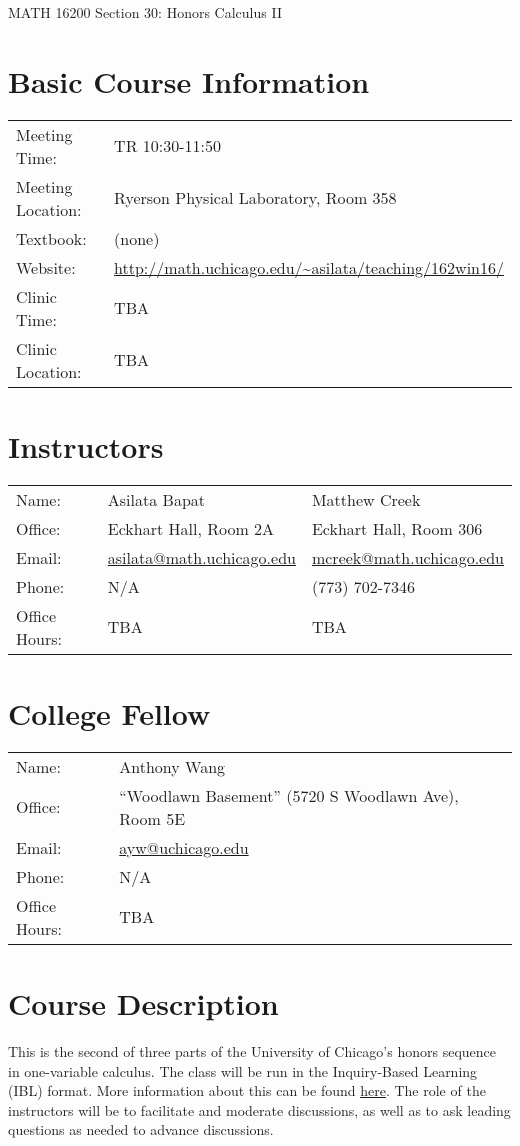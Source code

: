 \documentclass[9pt]{extarticle}
\begin{document}
\begin{center}{\LARGE MATH 16200 Section 30: Honors Calculus II}\end{center}
\vspace{2em}

\section*{Basic Course Information}
\begin{tabular}{l l}
  Meeting Time:& TR 10:30-11:50\\
  Meeting Location:& Ryerson Physical Laboratory, Room 358\\
  Textbook:&(none)\\
  Website:& \url{http://math.uchicago.edu/~asilata/teaching/162win16/}\\
  Clinic Time:& TBA\\
  Clinic Location:&TBA
\end{tabular}

\section*{Instructors}
\begin{tabular}{l l l}
  Name:&Asilata Bapat& Matthew Creek\\
  Office:&Eckhart Hall, Room 2A&Eckhart Hall, Room 306\\
  Email:&\url{asilata@math.uchicago.edu}& \url{mcreek@math.uchicago.edu}\\
  Phone:&N/A& (773) 702-7346\\
  Office Hours:&TBA & TBA
\end{tabular}

\section*{College Fellow}
\begin{tabular}{l l}
  Name:&Anthony Wang\\
  Office:&``Woodlawn Basement'' (5720 S Woodlawn Ave), Room 5E\\
  Email:&\url{ayw@uchicago.edu}\\
  Phone:&N/A\\
  Office Hours:&TBA
\end{tabular}

\section*{Course Description}
This is the second of three parts of the University of Chicago's honors sequence in one-variable calculus.
The class will be run in the Inquiry-Based Learning (IBL) format. 
More information about this can be found \href{http://math.uchicago.edu/~asilata/teaching/162win16/ibl.pdf}{here}.
The role of the instructors will be to facilitate and moderate discussions, as well as to ask leading questions as needed to advance discussions.
\end{document}
